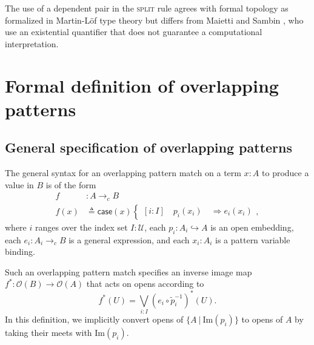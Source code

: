 \documentclass[conference]{IEEEtran}
\newtheorem{definition}{Definition}
\newcommand{\hookto}{\hookrightarrow}
\newcommand{\cto}{\to_c}
\newcommand{\Type}{\mathcal{U}}
\newcommand{\suchthat}{\ |\ }
\newcommand{\Open}[1]{\mathcal{O}({#1})}
\newcommand{\irule}[1]{\textsc{#1}}
\newcommand{\Img}[1]{\text{Im}\left({#1}\right)}
\newcommand{\Branch}{\Rightarrow}
\newcommand{\comment}[1]{}
\newcommand{\iimg}[1]{#1^*}
\begin{document}
The use of a dependent pair in the \irule{split} rule agrees with formal topology as formalized in Martin-L\"of type theory but differs from Maietti and Sambin \cite{whypointfree}, who use an existential quantifier that does not guarantee a computational interpretation.

\comment{
\begin{definition}
An \emph{inductively generated formal space} is a preorder $S$ together with a function 
\[
C : S \to \Sigma (I : \Type).\ I \to (S \to \Type),
\]
called an \emph{axiom set}.
\end{definition}

The preorder $S$ represents a base for the opens of the space. The construction in \cite{coquand2003} generates the ``free'' space $X$ whose base is $S$, with an inclusion of the base $y : S \to \Open{X}$ that satisfies, for each $s : S$, letting $(I, U) = C(s)$, for any $i : I$, 
\begin{mathpar}
\inferrule*
  {}
  {ya \le \bigvee_{b : U_i} yb}
\end{mathpar}
}

\section{Formal definition of overlapping patterns}
\label{s:patterns}

\subsection{General specification of overlapping patterns}
The general syntax for an overlapping pattern match on a term $x : A$ to produce a value in $B$ is of the form
\begin{align*}
f &: A \cto B
\\ f(x) &\triangleq \mathsf{case}(x)
\begin{cases}
[i : I] \quad p_i(x_i) \quad \Branch e_i(x_i)
\end{cases},
\end{align*}
where $i$ ranges over the index set $I : \Type$, each $p_i : A_i \hookto A$ is an open embedding, each $e_i : A_i \cto B$ is a general expression, and each $x_i : A_i$ is a pattern variable binding.

Such an overlapping pattern match specifies an inverse image map $\iimg{f} : \Open{B} \to \Open{A}$ that acts on opens according to
\[
\iimg{f}(U) = \bigvee_{i : I} \iimg{(e_i \circ \tilde{p}_i^{-1})}(U).
\]
In this definition, we implicitly convert opens of $\{ A \suchthat \Img{p_i} \}$ to opens of $A$ by taking their meets with $\Img{p_i}$.
\end{document}
